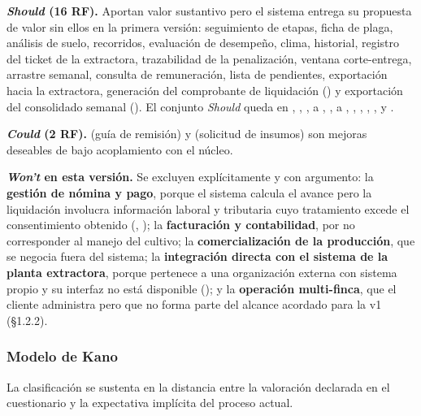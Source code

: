 \textbf{\emph{Should} (16 RF).} Aportan valor sustantivo pero el sistema entrega su propuesta de
valor sin ellos en la primera versión: seguimiento de etapas, ficha de plaga, análisis de
suelo, recorridos, evaluación de desempeño, clima, historial, registro del ticket de la extractora,
trazabilidad de la penalización, ventana corte-entrega, arrastre semanal, consulta de remuneración,
lista de pendientes, exportación hacia la extractora, generación del comprobante de liquidación
() y exportación del consolidado semanal (). El conjunto \emph{Should} queda en
, , ,  a , ,  a
, , , , ,  y .

\noindent{}

\textbf{\emph{Could} (2 RF).}  (guía de remisión) y  (solicitud de insumos) son
mejoras deseables de bajo acoplamiento con el núcleo.

\textbf{\emph{Won't} en esta versión.} Se excluyen explícitamente y con argumento: la
\textbf{gestión de nómina y pago}, porque el sistema calcula el avance pero la liquidación
involucra información laboral y tributaria cuyo tratamiento excede el consentimiento obtenido
(, ); la \textbf{facturación y contabilidad}, por no corresponder al manejo del
cultivo; la \textbf{comercialización de la producción}, que se negocia fuera del sistema; la
\textbf{integración directa con el sistema de la planta extractora}, porque pertenece a una
organización externa con sistema propio y su interfaz no está disponible (); y la
\textbf{operación multi-finca}, que el cliente administra pero que no forma parte del alcance
acordado para la v1 (§1.2.2).

\subsubsection{Modelo de Kano}

La clasificación se sustenta en la distancia entre la valoración declarada en el cuestionario y la
expectativa implícita del proceso actual.

